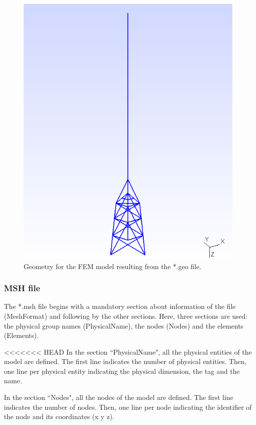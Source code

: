 \documentclass[a4]{article}
\begin{document}
\begin{figure}[tbh!]
	\centering
	\includegraphics[scale=0.6]{geo1.png}
	\caption{Geometry for the FEM model resulting from the *.geo file.}
	\label{fig:geo1}
\end{figure}

\subsubsection{MSH file}

The *.msh file begins with a mandatory section about information of the file (MeshFormat) and following by the other sections. Here, three sections are used: the physical group names (PhysicalName), the nodes (Nodes) and the elements (Elements).

<<<<<<< HEAD
In the section ``PhysicalName", all the physical entities of the model are defined. The first line indicates the number of physical entities. Then, one line per physical entity indicating the physical dimension, the tag and the name.  

In the section ``Nodes", all the nodes of the model are defined. The first line indicates the number of nodes. Then, one line per node indicating the identifier of the node and its coordinates (x y z).
\end{document}
